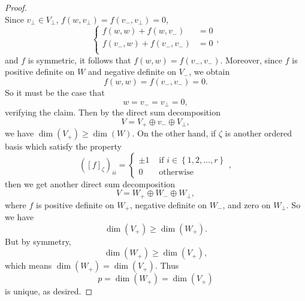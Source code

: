 \documentclass[linearalgebraII]{subfiles}
\begin{document}
\begin{proof}
\begin{equation*}
        \end{equation*}
        Since $v_\perp\in V_\perp$, $f\left( w,v_\perp \right) = f\left( v_-,v_\perp \right) = 0$,
        \begin{equation*}
            \begin{cases} 
                f\left( w,w \right) + f\left( w,v_- \right) & = 0 \\
                f\left( v_-,w \right) + f\left( v_-,v_- \right) & = 0 \\
            \end{cases},
        \end{equation*}
        and $f$ is symmetric, it follows that $f\left( w,w \right) = f\left( v_-,v_- \right)$. Moreover, since $f$ is positive definite on $W$ and negative definite on $V_-$, we obtain
        \begin{equation*}
            f\left( w,w \right) = f\left( v_-,v_- \right) = 0.
        \end{equation*}
        So it must be the case that
        \begin{equation*}
            w = v_- = v_\perp = 0,
        \end{equation*}
        verifying the claim. Then by the direct sum decomposition
        \begin{equation*}
            V = V_+\oplus v_-\oplus V_\perp,
        \end{equation*}
        we have $\dim\left( V_+ \right) \geq \dim\left( W \right)$. On the other hand, if $\zeta$ is another ordered basis which satisfy the property
        \begin{equation*}
            \left( \left[ f \right] _\zeta \right) _{ii} =
            \begin{cases} 
                \pm 1 & \text{ if } i\in\left\lbrace 1,2,\ldots,r \right\rbrace \\ 
                0 & \text{ otherwise }
            \end{cases},
        \end{equation*}
        then we get another direct sum decomposition
        \begin{equation*}
            V = W_+\oplus W_-\oplus W_\perp,
        \end{equation*}
        where $f$ is positive definite on $W_+$, negative definite on $W_-$, and zero on $W_\perp$. So we have
        \begin{equation*}
            \dim\left( V_+ \right) \geq \dim\left( W_+ \right) .
        \end{equation*}
        But by symmetry,
        \begin{equation*}
            \dim\left( W_+ \right) \geq \dim\left( V_+ \right) ,
        \end{equation*}
        which means $\dim\left( W_+ \right) = \dim\left( V_+ \right)$. Thus
        \begin{equation*}
            p = \dim\left( W_+ \right) = \dim\left( V_+ \right) 
        \end{equation*}
        is unique, as desired.
    \end{proof}
\end{document}
